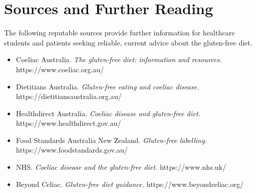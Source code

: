 \section*{Sources and Further Reading}
The following reputable sources provide further information for healthcare students and patients seeking reliable, current advice about the gluten-free diet.

\begin{itemize}
    \item Coeliac Australia. \textit{The gluten-free diet: information and resources.} https://www.coeliac.org.au/
    \item Dietitians Australia. \textit{Gluten-free eating and coeliac disease.} https://dietitiansaustralia.org.au/
    \item Healthdirect Australia. \textit{Coeliac disease and gluten-free diet.} https://www.healthdirect.gov.au/
    \item Food Standards Australia New Zealand. \textit{Gluten-free labelling.} https://www.foodstandards.gov.au/
    \item NHS. \textit{Coeliac disease and the gluten-free diet.} https://www.nhs.uk/
    \item Beyond Celiac. \textit{Gluten-free diet guidance.} https://www.beyondceliac.org/
\end{itemize}
